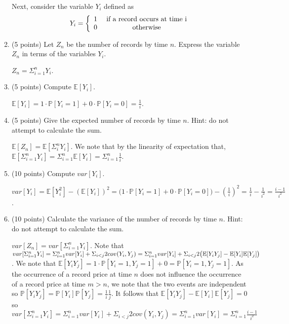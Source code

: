 \documentclass[12pt,twoside, letter]{exam}
\theoremstyle{definition}
\newcommand{\ee}{\mathbb{E}}
\begin{document}
\begin{enumerate}
	Next, consider the variable $Y_i$ defined as
	\[Y_i=\left\{\begin{array}{cc}
	1&\mbox{ if  a record occurs at time }$i$\\
	0& \mbox{ otherwise}\end{array}\right.\]
	\item (5 points) Let $Z_n$ be the number of records by time $n$. Express the variable $Z_n$ in terms of the variables $Y_i$.
    \begin{solution}
      $Z_{n} = \Sigma^{n}_{i=1} Y_{i}$.
    \end{solution}
	\item (5 points) Compute $\mathbb{E}[Y_i]$.
    \begin{solution}
      $\mathbb{E}[Y_{i}] = 1\cdot \mathbb{P}[Y_{i} = 1] + 0 \cdot \mathbb{P}[Y_{i} = 0] = \frac{1}{i}$.
    \end{solution}
	\item (5 points) Give the expected number of records by time $n$. Hint: do not attempt to calculate the sum.
    \begin{solution}
      $\mathbb{E}[Z_{n}] = \mathbb{E}[\Sigma^{n}_{i} Y_{i}]$. We note that by the linearity of expectation that, $\mathbb{E}[\Sigma^{n}_{i=1} Y_{i}] = \Sigma^{n}_{i=1} \mathbb{E}[Y_{i}]
        = \Sigma^{n}_{i=1} \frac{1}{i}$.
    \end{solution}
	\item (10 points) Compute $var[Y_i]$.
    \begin{solution}
      $var[Y_i] = \ee[Y_{i}^2] - (\ee[Y_{i}])^{2} = \big( 1 \cdot \mathbb{P}[Y_{i} = 1] + 0 \cdot \mathbb{P}[Y_{i} = 0] \big) - (\frac{1}{i})^{2} = \frac{1}{i} - \frac{1}{i^2} = \frac{i-1}{i^{2}}$.
    \end{solution}
  \item (10 points) Calculate the variance of the number of records by time $n$. Hint: do not attempt to calculate the sum.
    \begin{solution}
      $var[Z_{n}] = var[\Sigma^{n}_{i=1} Y_{i}]$. Note that $var[\Sigma^{n}_{i=1} Y_{i}] \\
= \Sigma^{n}_{i=1} var[Y_{i}] + \Sigma_{i<j} 2cov(Y_{i},Y_{j})
      =\Sigma^{n}_{i=1} var[Y_{i}] + \Sigma_{i<j} 2\big( \ee[Y_{i}Y_{j}] - \ee[Y_{i}]\ee[Y_{j}] \big)$. We note that $\ee[Y_{i}Y_{j}] = 1\cdot \mathbb{P}[Y_{i} = 1, Y_{j} = 1] + 0 = \mathbb{P}[Y_{i} = 1, Y_{j} = 1]$.
      As the occurrence of a record price at time $n$ does not influence the occurrence of a record price at time $m > n$, we note that the two events are independent so $\mathbb{P}[Y_{i}Y_{j}] = \mathbb{P}[Y_{i}]\mathbb{P}[Y_{j}]
      =\frac{1}{i}\frac{1}{j}$. It follows that $\ee[Y_{i}Y_{j}] - \ee[Y_{i}]\ee[Y_{j}] = 0$ so $var[\Sigma^{n}_{i=1} Y_{i}]
      = \Sigma^{n}_{i=1} var[Y_{i}] + \Sigma_{i<j} 2cov(Y_{i},Y_{j}) = \Sigma^{n}_{i=1} var[Y_{i}] = \Sigma^{n}_{i = 1} \frac{i-1}{i^{2}}$
    \end{solution}
\end{enumerate}
\end{document}

